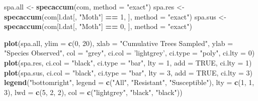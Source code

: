 \documentclass[]{article}
\newenvironment{Shaded}{\begin{snugshade}}{\end{snugshade}}
\newcommand{\KeywordTok}[1]{\textcolor[rgb]{0.13,0.29,0.53}{\textbf{#1}}}
\newcommand{\DataTypeTok}[1]{\textcolor[rgb]{0.13,0.29,0.53}{#1}}
\newcommand{\DecValTok}[1]{\textcolor[rgb]{0.00,0.00,0.81}{#1}}
\newcommand{\StringTok}[1]{\textcolor[rgb]{0.31,0.60,0.02}{#1}}
\newcommand{\OtherTok}[1]{\textcolor[rgb]{0.56,0.35,0.01}{#1}}
\newcommand{\OperatorTok}[1]{\textcolor[rgb]{0.81,0.36,0.00}{\textbf{#1}}}
\newcommand{\NormalTok}[1]{#1}
\begin{document}
\begin{Shaded}
\begin{Highlighting}[]
\NormalTok{spa.all <-}\StringTok{ }\KeywordTok{specaccum}\NormalTok{(com, }\DataTypeTok{method =} \StringTok{"exact"}\NormalTok{)}
\NormalTok{spa.res <-}\StringTok{ }\KeywordTok{specaccum}\NormalTok{(com[l.dat[, }\StringTok{"Moth"}\NormalTok{] }\OperatorTok{==}\StringTok{ }\DecValTok{1}\NormalTok{, ], }\DataTypeTok{method =} \StringTok{"exact"}\NormalTok{)}
\NormalTok{spa.sus <-}\StringTok{ }\KeywordTok{specaccum}\NormalTok{(com[l.dat[, }\StringTok{"Moth"}\NormalTok{] }\OperatorTok{==}\StringTok{ }\DecValTok{0}\NormalTok{, ], }\DataTypeTok{method =} \StringTok{"exact"}\NormalTok{)}

\KeywordTok{plot}\NormalTok{(spa.all,}
     \DataTypeTok{ylim =} \KeywordTok{c}\NormalTok{(}\DecValTok{0}\NormalTok{, }\DecValTok{20}\NormalTok{),}
     \DataTypeTok{xlab =} \StringTok{"Cumulative Trees Sampled"}\NormalTok{,}
     \DataTypeTok{ylab =} \StringTok{"Species Observed"}\NormalTok{, }
     \DataTypeTok{col =} \StringTok{"grey"}\NormalTok{, }\DataTypeTok{ci.col =} \StringTok{'lightgrey'}\NormalTok{, }\DataTypeTok{ci.type =} \StringTok{"poly"}\NormalTok{, }\DataTypeTok{ci.lty =} \DecValTok{0}\NormalTok{)}
\KeywordTok{plot}\NormalTok{(spa.res, }\DataTypeTok{ci.col =} \StringTok{"black"}\NormalTok{, }\DataTypeTok{ci.type =} \StringTok{"bar"}\NormalTok{, }\DataTypeTok{lty =} \DecValTok{1}\NormalTok{, }\DataTypeTok{add =} \OtherTok{TRUE}\NormalTok{, }\DataTypeTok{ci.lty =} \DecValTok{1}\NormalTok{)}
\KeywordTok{plot}\NormalTok{(spa.sus, }\DataTypeTok{ci.col =} \StringTok{"black"}\NormalTok{, }\DataTypeTok{ci.type =} \StringTok{"bar"}\NormalTok{, }\DataTypeTok{lty =} \DecValTok{3}\NormalTok{, }\DataTypeTok{add =} \OtherTok{TRUE}\NormalTok{, }\DataTypeTok{ci.lty =} \DecValTok{3}\NormalTok{)}
\KeywordTok{legend}\NormalTok{(}\StringTok{"bottomright"}\NormalTok{, }
       \DataTypeTok{legend =} \KeywordTok{c}\NormalTok{(}\StringTok{"All"}\NormalTok{, }\StringTok{"Resistant"}\NormalTok{, }\StringTok{"Susceptible"}\NormalTok{), }
       \DataTypeTok{lty =} \KeywordTok{c}\NormalTok{(}\DecValTok{1}\NormalTok{, }\DecValTok{1}\NormalTok{, }\DecValTok{3}\NormalTok{), }\DataTypeTok{lwd =} \KeywordTok{c}\NormalTok{(}\DecValTok{5}\NormalTok{, }\DecValTok{2}\NormalTok{, }\DecValTok{2}\NormalTok{), }\DataTypeTok{col =} \KeywordTok{c}\NormalTok{(}\StringTok{"lightgrey"}\NormalTok{, }\StringTok{"black"}\NormalTok{, }\StringTok{"black"}\NormalTok{))}
\end{Highlighting}
\end{Shaded}
\end{document}
